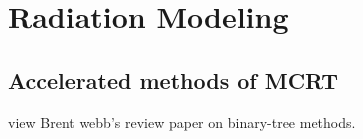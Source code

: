 \addchapheadtotoc
\chapter{Radiation Modeling}\label{chapter:Modeling}


\section{Accelerated methods of MCRT}

view Brent webb's review paper on binary-tree methods.